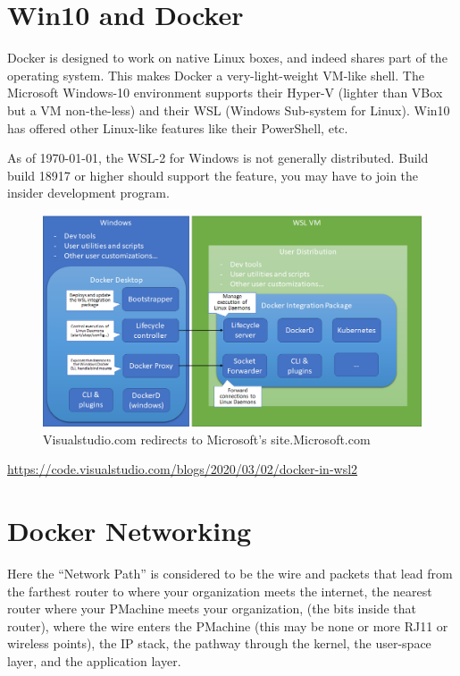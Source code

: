 \documentclass[letter,11pt,oneside]{article}
\begin{document}
\section{Win10 and Docker}

Docker is designed to work on native Linux boxes, and indeed shares
part of the operating system. This makes Docker a very-light-weight
VM-like shell. The Microsoft Windows-10 environment supports
their Hyper-V (lighter than VBox but a VM non-the-less) and their
WSL (Windows Sub-system for Linux). Win10 has offered other
Linux-like features like their PowerShell, etc.

As of \today, the WSL-2 for Windows is not generally distributed.
Build build 18917 or higher should support the feature, you may
have to join the insider development program.


\begin{figure}[h!]
\centering
\includegraphics[width=.7\textwidth]{images/docker-in-wsl2.png}
\caption[Visualstudio]{Visualstudio.com redirects to Microsoft's site.{\tiny{Microsoft.com}}} 
\label{figure:docker-in-wsl2}
\end{figure}


\url{https://code.visualstudio.com/blogs/2020/03/02/docker-in-wsl2}

\section{Docker Networking}

Here the ``Network Path'' is considered to be the wire and packets that
lead from the farthest router to where your organization meets the
internet, the nearest router where your PMachine meets your organization,
(the bits inside that router), where the wire enters the PMachine
(this may be none or more RJ11 or wireless points), the IP stack,
the pathway through the kernel, the user-space layer, and the application
layer.
\end{document}
